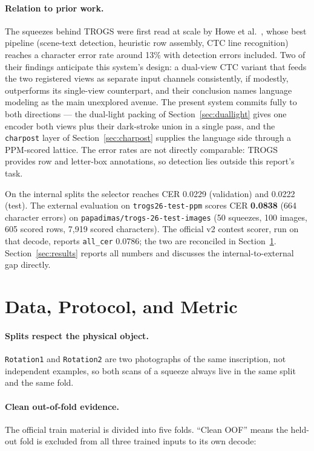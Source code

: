 \documentclass[11pt]{article}
\newcommand{\cer}{\mbox{CER}}
\newcommand{\charpost}{\texttt{charpost}}
\begin{document}
\paragraph{Relation to prior work.} The squeezes behind TROGS were first read at scale by Howe et
al.~\cite{howe2025}, whose best pipeline (scene-text detection, heuristic row assembly, CTC line
recognition) reaches a character error rate around 13\% with detection errors included. Two of
their findings anticipate this system's design: a dual-view CTC variant that feeds the two
registered views as separate input channels consistently, if modestly, outperforms its single-view
counterpart, and their conclusion names language modeling as the main unexplored avenue. The
present system commits fully to both directions --- the dual-light packing of
Section~\ref{sec:duallight} gives one encoder both views plus their dark-stroke union in a single
pass, and the \charpost{} layer of Section~\ref{sec:charpost} supplies the language side through a
PPM-scored lattice. The error rates are not directly comparable: TROGS provides row and letter-box
annotations, so detection lies outside this report's task.

On the internal splits the selector reaches \cer{} 0.0229 (validation) and 0.0222
(test). The external evaluation on \texttt{trogs26-test-ppm} scores \cer{} \textbf{0.0838}
(664 character errors) on \texttt{papadimas/trogs-26-test-images} (50 squeezes, 100
images, 605 scored rows, 7,919 scored characters). The official v2 contest scorer, run on
that decode, reports \texttt{all\_cer} 0.0786; the two are reconciled in
Section~\ref{sec:protocol}. Section~\ref{sec:results} reports all numbers and discusses the
internal-to-external gap directly.

\section{Data, Protocol, and Metric}
\label{sec:protocol}
\paragraph{Splits respect the physical object.} \texttt{Rotation1} and \texttt{Rotation2} are two
photographs of the same inscription, not independent examples, so both scans of a squeeze always
live in the same split and the same fold.

\paragraph{Clean out-of-fold evidence.} The official train material is divided into five folds.
``Clean OOF'' means the held-out fold is excluded from all three trained inputs to its own decode:
\end{document}
